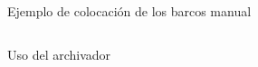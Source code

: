 \begin{frame}
    \begin{columns}
        \column{\dimexpr\paperwidth-10pt}
        \begin{figure}
            \caption{Ejemplo de colocación de los barcos manual}
          \end{figure}
      \end{columns}   
\end{frame}


\begin{frame}
    \begin{columns}
        \column{\dimexpr\paperwidth-10pt}
        \begin{figure}
            \caption{Uso del archivador}
          \end{figure}
      \end{columns}
\end{frame}

